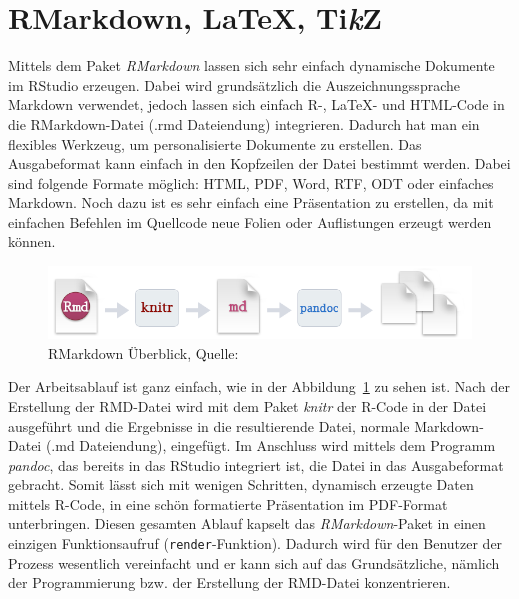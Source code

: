 \section{RMarkdown, \LaTeX, Ti\textit{k}Z}
\label{sec:RMarkdown}
Mittels dem Paket \emph{RMarkdown} lassen sich sehr einfach dynamische Dokumente im RStudio erzeugen. Dabei wird grundsätzlich die Auszeichnungssprache Markdown verwendet, jedoch lassen sich einfach R-, \LaTeX - und HTML-Code in die RMarkdown-Datei (.rmd Dateiendung) integrieren. Dadurch hat man ein flexibles Werkzeug, um personalisierte Dokumente zu erstellen. Das Ausgabeformat kann einfach in den Kopfzeilen der Datei bestimmt werden. Dabei sind folgende Formate möglich: HTML, PDF, Word, RTF, ODT oder einfaches Markdown. Noch dazu ist es sehr einfach eine Präsentation zu erstellen, da mit einfachen Befehlen im Quellcode neue Folien oder Auflistungen erzeugt werden können.

\begin{figure}[th]
\centering
\includegraphics[width=\ScaleIfNeeded]{pictures/RMarkdown}
\caption{RMarkdown Überblick, Quelle: \cite{rmarkdown}}
\label{pic:RMarkdown}
\end{figure}

Der Arbeitsablauf ist ganz einfach, wie in der Abbildung~\ref{pic:RMarkdown} zu sehen ist. Nach der Erstellung der RMD-Datei wird mit dem Paket \emph{knitr} der R-Code in der Datei ausgeführt und die Ergebnisse in die resultierende Datei, normale Markdown-Datei (.md Dateiendung), eingefügt. Im Anschluss wird mittels dem Programm \emph{pandoc}, das bereits in das RStudio integriert ist, die Datei in das Ausgabeformat gebracht. Somit lässt sich mit wenigen Schritten, dynamisch erzeugte Daten mittels R-Code, in eine schön formatierte Präsentation im PDF-Format unterbringen. Diesen gesamten Ablauf kapselt das \emph{RMarkdown}-Paket in einen einzigen Funktionsaufruf (\texttt{render}-Funktion). Dadurch wird für den Benutzer der Prozess wesentlich vereinfacht und er kann sich auf das Grundsätzliche, nämlich der Programmierung bzw. der Erstellung der RMD-Datei konzentrieren. \cite{rmarkdown}

